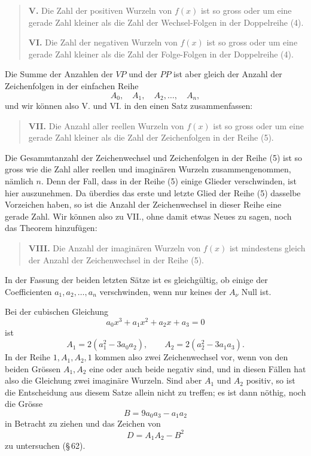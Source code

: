 \documentclass[11pt]{article}
\begin{document}
\begin{quote}
\textbf{V.} Die Zahl der positiven Wurzeln von $f(x)$ ist so gross oder um eine gerade Zahl kleiner als die Zahl der Wechsel-Folgen in der Doppelreihe (4).

\textbf{VI.} Die Zahl der negativen Wurzeln von $f(x)$ ist so gross oder um eine gerade Zahl kleiner als die Zahl der Folge-Folgen in der Doppelreihe (4).
\end{quote}

Die Summe der Anzahlen der $VP$ und der $PP$ ist aber gleich der Anzahl der Zeichenfolgen in der einfachen Reihe
\begin{equation}
        A_0,\quad A_1,\quad A_2,\ldots,\quad A_n,
\tag{5}
\end{equation}
und wir können also V. und VI. in den einen Satz zusammenfassen:

\begin{quote}
\textbf{VII.} Die Anzahl aller reellen Wurzeln von $f(x)$ ist so gross oder um eine gerade Zahl kleiner als die Zahl der Zeichenfolgen in der Reihe (5).
\end{quote}

Die Gesammtanzahl der Zeichenwechsel und Zeichenfolgen in der Reihe (5) ist so gross wie die Zahl aller reellen und imaginären Wurzeln zusammengenommen, nämlich $n$. Denn der Fall, dass in der Reihe (5) einige Glieder verschwinden, ist hier auszunehmen. Da überdies das erste und letzte Glied der Reihe (5) dasselbe Vorzeichen haben, so ist die Anzahl der Zeichenwechsel in dieser Reihe eine gerade Zahl. Wir können also zu VII., ohne damit etwas Neues zu sagen, noch das Theorem hinzufügen:

\begin{quote}
\textbf{VIII.} Die Anzahl der imaginären Wurzeln von $f(x)$ ist mindestens gleich der Anzahl der Zeichenwechsel in der Reihe (5).
\end{quote}

In der Fassung der beiden letzten Sätze ist es gleichgültig, ob einige der Coefficienten $a_1,a_2,\ldots,a_n$ verschwinden, wenn nur keines der $A_\nu$ Null ist.

Bei der cubischen Gleichung
\[
        a_0x^3+a_1x^2+a_2x+a_3=0
\]
ist
\[
        A_1=2(a_1^2-3a_0a_2),\qquad
        A_2=2(a_2^2-3a_1a_3).
\]
In der Reihe $1,A_1,A_2,1$ kommen also zwei Zeichenwechsel vor, wenn von den beiden Grössen $A_1,A_2$ eine oder auch beide negativ sind, und in diesen Fällen hat also die Gleichung zwei imaginäre Wurzeln. Sind aber $A_1$ und $A_2$ positiv, so ist die Entscheidung aus diesem Satze allein nicht zu treffen; es ist dann nöthig, noch die Grösse
\[
        B=9a_0a_3-a_1a_2
\]
in Betracht zu ziehen und das Zeichen von
\[
        D=A_1A_2-B^2
\]
zu untersuchen (\S\,62).
\end{document}
